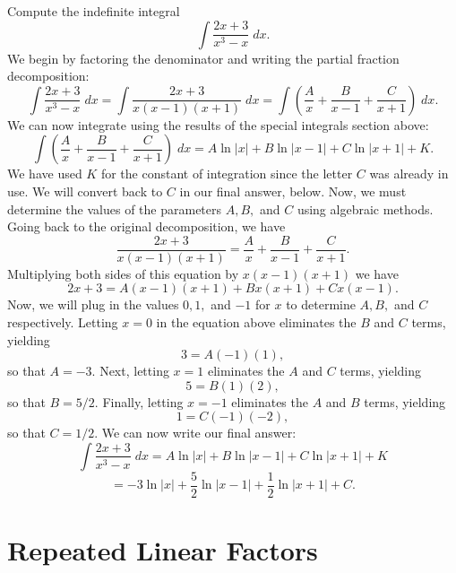\documentclass{ximera}
\begin{document}
\begin{example}

Compute the indefinite integral
\[
\int \frac{2x+3}{x^3 -x} \; dx.
\]
We begin by factoring the denominator and writing the partial fraction decomposition:
\[
\int \frac{2x+3}{x^3 -x} \; dx = \int \frac{2x+3}{x(x-1)(x+1)} \; dx = \int \left( \frac{A}{x} + \frac{B}{x-1} + \frac{C}{x+1} \right) \; dx.
\]
We can now integrate using the results of the special integrals section above:
\[
\int \left( \frac{A}{x} + \frac{B}{x-1} + \frac{C}{x+1} \right) \; dx = A\ln|x| + B\ln|x-1| + C\ln|x+1| + K.
\]
We have used $K$ for the constant of integration since the letter $C$ was already in use.  We will convert back to $C$ in our final answer, below.
Now, we must determine the values of the parameters $A, B, $ and $C$ using algebraic methods.
Going back to the original decomposition, we have
\[
\frac{2x+3}{x(x-1)(x+1)} = \frac{A}{x}  + \frac{B}{x-1} + \frac{C}{x+1}.
\]
Multiplying both sides of this equation by $x(x-1)(x+1)$ we have
\[
2x+3 = A(x-1)(x+1) + Bx(x+1) + Cx(x-1).
\]
Now, we will plug in the values $0, 1, $ and $-1$ for $x$ to determine $A, B, $ and $C$ respectively.
Letting $x = 0$ in the equation above eliminates the $B$ and $C$ terms, yielding
\[
3 = A(-1)(1),
\]
so that $A = -3$.
Next, letting $x = 1$ eliminates the $A$ and $C$ terms, yielding
\[
5 = B(1)(2),
\]
so that $B = 5/2$. Finally, letting $x = -1$ eliminates the $A$ and $B$ terms, yielding
\[
1 = C(-1)(-2),
\]
so that $C = 1/2$.
We can now write our final answer:
\[
\int \frac{2x+3}{x^3 -x} \; dx = A\ln|x| + B\ln|x-1| + C\ln|x+1| + K
\]
\[
 = -3\ln|x| + \frac52 \ln|x-1| + \frac12 \ln|x+1| + C.
\]

\end{example}



\begin{center}
\begin{foldable}
\end{foldable}
\end{center}


\section{Repeated Linear Factors}
\end{document}
